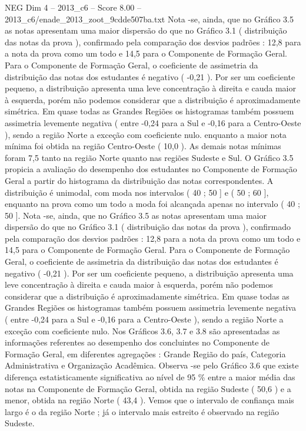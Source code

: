 \begin{textsample}{NEG Dim 4 – 2013\_c6 – Score 8.00 – 2013\_c6/enade\_2013\_zoot\_9cdde507ba.txt}
Nota -se, ainda, que no Gráfico 3.5 as notas apresentam uma maior dispersão do que no Gráfico 3.1 ( distribuição das notas da prova ), confirmado pela comparação dos desvios padrões : 12,8 para a nota da prova como um todo e 14,5 para o Componente de Formação Geral.
Para o Componente de Formação Geral, o coeficiente de assimetria da distribuição das notas dos estudantes é negativo ( -0,21 ).
Por ser um coeficiente pequeno, a distribuição apresenta uma leve concentração à direita e cauda maior à esquerda, porém não podemos considerar que a distribuição é aproximadamente simétrica.
Em quase todas as Grandes Regiões os histogramas também possuem assimetria levemente negativa ( entre -0,24 para a Sul e -0,16 para a Centro-Oeste ), sendo a região Norte a exceção com coeficiente nulo. enquanto a maior nota mínima foi obtida na região Centro-Oeste ( 10,0 ).
As demais notas mínimas foram 7,5 tanto na região Norte quanto nas regiões Sudeste e Sul.
O Gráfico 3.5 propicia a avaliação do desempenho dos estudantes no Componente de Formação Geral a partir do histograma da distribuição das notas correspondentes.
A distribuição é unimodal, com moda nos intervalos ( 40 ; 50 ] e ( 50 ; 60 ], enquanto na prova como um todo a moda foi alcançada apenas no intervalo ( 40 ; 50 ].
Nota -se, ainda, que no Gráfico 3.5 as notas apresentam uma maior dispersão do que no Gráfico 3.1 ( distribuição das notas da prova ), confirmado pela comparação dos desvios padrões : 12,8 para a nota da prova como um todo e 14,5 para o Componente de Formação Geral.
Para o Componente de Formação Geral, o coeficiente de assimetria da distribuição das notas dos estudantes é negativo ( -0,21 ).
Por ser um coeficiente pequeno, a distribuição apresenta uma leve concentração à direita e cauda maior à esquerda, porém não podemos considerar que a distribuição é aproximadamente simétrica.
Em quase todas as Grandes Regiões os histogramas também possuem assimetria levemente negativa ( entre -0,24 para a Sul e -0,16 para a Centro-Oeste ), sendo a região Norte a exceção com coeficiente nulo.
Nos Gráficos 3.6, 3.7 e 3.8 são apresentadas as informações referentes ao desempenho dos concluintes no Componente de Formação Geral, em diferentes agregações : Grande Região do país, Categoria Administrativa e Organização Acadêmica.
Observa -se pelo Gráfico 3.6 que existe diferença estatisticamente significativa ao nível de 95 \% entre a maior média das notas na Componente de Formação Geral, obtida na região Sudeste ( 50,6 ) e a menor, obtida na região Norte ( 43,4 ).
Vemos que o intervalo de confiança mais largo é o da região Norte ; já o intervalo mais estreito é observado na região Sudeste.

\end{textsample}
